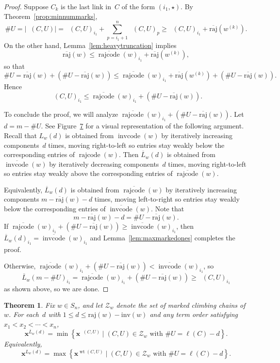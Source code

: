 \documentclass[10pt,a4paper]{amsart}
\newcommand{\absrajcode}[1]{\mathrm{raj}(#1)}
\newcommand{\absoverrajcode}[1]{\overline{\mathrm{raj}}(#1)}
\newcommand{\absinvcode}[1]{\mathrm{inv}(#1)}
\DeclareMathOperator{\wt}{\mathrm{wt}}
\DeclareMathOperator{\dwt}{\overline{\mathrm{wt}}}
\DeclareMathOperator{\cc}{\mathrm{invcode}}
\newcommand{\occ}{\overline{\cc}}
\DeclareMathOperator{\rr}{\mathrm{rajcode}}
\newcommand{\orr}{\overline{\rr}}
\newcommand{\LL}{\overline{L}}
\newtheorem{theorem}{Theorem}[section]
\begin{document}
\begin{proof}
	Suppose $C_k$ is the last link in~$C$ of the form $(i_1,\star)$. 
	By Theorem~\ref{prop:minnummarks},
	\[\#U = |\dwt(C,U)| = \dwt(C,U)_{i_1}+\sum_{p=i_1+1}^n\dwt(C,U)_p \geq \dwt(C,U)_{i_1} + \absoverrajcode{w^{(k)}}. \]
	On the other hand, Lemma~\ref{lem:heavytruncation} implies 
	\[\absoverrajcode{w} \leq \orr(w)_{i_1} + \absoverrajcode{w^{(k)}},\]
	so that
	\[\#U = \absoverrajcode{w} + (\#U - \absoverrajcode{w})\leq \orr(w)_{i_1} + \absoverrajcode{w^{(k)}} + (\#U - \absoverrajcode{w}).\]
	Hence
	\[\dwt(C,U)_{i_1} \leq \orr(w)_{i_1} + (\#U - \absoverrajcode{w}).\]
	
	To conclude the proof, we will analyze $\orr(w)_{i_1} + (\#U - \absoverrajcode{w})$.
	Let $d=m-\#U$. See Figure~\href{https://alco.centre-mersenne.org/articles/10.5802/alco.358/}{7} for a visual representation of the following argument. Recall that $L_w(d)$ is obtained from $\cc(w)$ by iteratively increasing components~$d$ times, moving right-to-left so entries stay weakly below the corresponding entries of $\rr(w)$. Then $\LL_w(d)$ is obtained from $\occ(w)$ by iteratively decreasing components~$d$ times, moving right-to-left so entries stay weakly above the corresponding entries of $\orr(w)$.
	
	Equivalently, $\LL_w(d)$ is obtained from $\orr(w)$ by iteratively increasing components $m-\absoverrajcode{w}-d$ times, moving left-to-right so entries stay weakly below the corresponding entries of $\occ(w)$. Note that 
	\[m-\absoverrajcode{w}-d = \#U-\absoverrajcode{w}.\]
	If $\orr(w)_{i_1} + (\#U - \absoverrajcode{w})\geq \occ(w)_{i_1}$, then $\LL_w(d)_{i_1}=\occ(w)_{i_1}$ and Lemma~\ref{lem:maxmarkedones} completes the proof. 
	
	Otherwise, $\orr(w)_{i_1} + (\#U - \absoverrajcode{w})< \occ(w)_{i_1}$, so 
	\[\LL_w(m-\#U)_{i_1} = \orr(w)_{i_1} + (\#U - \absoverrajcode{w}) \geq \dwt(C,U)_{i_1}\]
	as shown above, so we are done.
\end{proof}

\setcounter{section}{11}\setcounter{theorem}{2}
\begin{theorem}
	\label{thm:interpolatingleadingterms}
	Fix $w\in S_n$, and let $\mathcal{Z}_w$ denote the set of marked climbing chains of $w$. For each~$d$ with $1\leq d\leq \absrajcode{w}-\absinvcode{w}$ and any term order satisfying $x_1<x_2<\cdots<x_n$,
	\[\bm{x}^{\LL_w(d)} = \min \left\{\bm{x}^{\dwt(C,U)} \mid (C,U)\in \mathcal{Z}_w \mbox{ with } \#U = 
	\ell(C) - d \right\}. \] 
	Equivalently, 
	\[\bm{x}^{L_w(d)} = \max \left\{\bm{x}^{\wt(C,U)} \mid (C,U)\in \mathcal{Z}_w \mbox{ with } \#U = 
	\ell(C) - d \right\}. \] 
\end{theorem}
\end{document}
